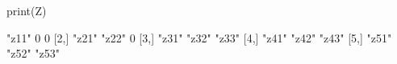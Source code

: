 \begin{Schunk}
\begin{Sinput}
 print(Z)
\end{Sinput}
\begin{Soutput}
     [,1]  [,2]  [,3] 
[1,] "z11" 0     0    
[2,] "z21" "z22" 0    
[3,] "z31" "z32" "z33"
[4,] "z41" "z42" "z43"
[5,] "z51" "z52" "z53"
\end{Soutput}
\end{Schunk}
